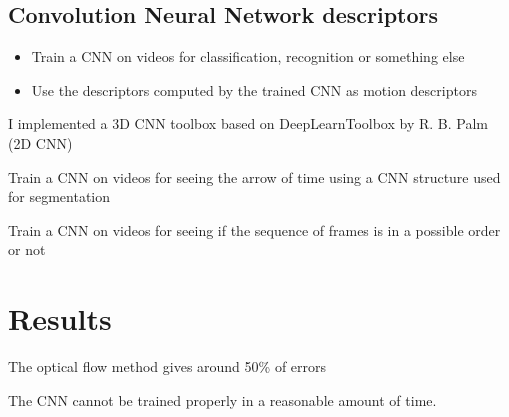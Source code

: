 \documentclass[10pt,a4paper]{report}
\begin{document}
		\subsection*{Convolution Neural Network descriptors}
		
		\begin{itemize}
			\item Train a CNN on videos for classification, recognition or something else
		\item Use the descriptors computed by the trained CNN as motion descriptors
		\end{itemize}
		
		I implemented a 3D CNN toolbox based on DeepLearnToolbox by R. B. Palm (2D CNN)
		\newline
		
		Train a CNN on videos for seeing the arrow of time using a CNN structure used for segmentation
		\newline
		
		Train a CNN on videos for seeing if the sequence of frames is in a possible order or not
		
		\section{Results}
		
			The optical flow method gives around 50\% of errors
			\newline
			
			The CNN cannot be trained properly in a reasonable amount of time.
		
\end{document}
